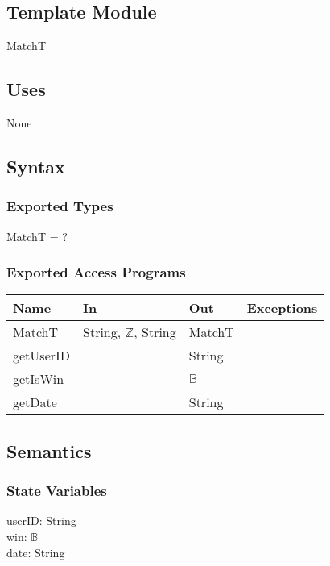 \documentclass[12pt, titlepage]{article}
\begin{document}
\subsection{Template Module}

MatchT

\subsection{Uses}

None


\subsection{Syntax}

\subsubsection{Exported Types}

MatchT = ?

\subsubsection{Exported Access Programs}

\begin{center}
\begin{tabular}{ |  p{4cm} | p{3cm} |  p{3cm} | p{5cm} | }
\hline
\textbf{Name} & \textbf{In} & \textbf{Out} & \textbf{Exceptions} \\
\hline
MatchT & String, $\mathbb{Z}$, String  & MatchT & \\
getUserID & & String & \\
getIsWin & & $\mathbb{B}$ & \\
getDate & & String & \\

\hline
\end{tabular}
\end{center}

\subsection{Semantics}


\subsubsection{State Variables}

userID: String\\
win: $\mathbb{B}$\\
date: String
\end{document}
